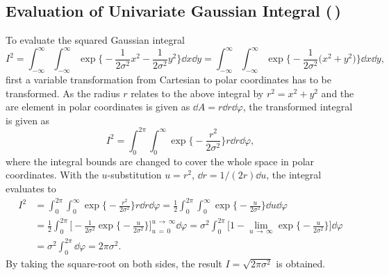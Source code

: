 \documentclass[11pt, a4paper]{scrartcl}
\newcommand{\diffstar}{\texorpdfstring{\raisebox{-1pt}{\resizebox{!}{8pt}{\(\star\)}}}{*}}
\newcommand{\twostar}  {(\diffstar\,\diffstar)}
\begin{document}
		\subsection{Evaluation of Univariate Gaussian Integral  \twostar}
			To evaluate the squared Gaussian integral
			\begin{equation}
				I^2
					= \int_{-\infty}^{\infty} \int_{-\infty}^{\infty} \! \exp\bigg\{\! -\frac{1}{2 \sigma^2} x^2 - \frac{1}{2 \sigma^2} y^2 \bigg\} \dd{x} \dd{y}
					= \int_{-\infty}^{\infty} \int_{-\infty}^{\infty} \! \exp\bigg\{\! -\frac{1}{2 \sigma^2} \big( x^2 + y^2 \big) \bigg\} \dd{x} \dd{y},
			\end{equation}
			first a variable transformation from Cartesian to polar coordinates has to be transformed. As the radius \(r\) relates to the above integral by \( r^2 = x^2 + y^2 \) and the are element in polar coordinates is given as \( \dd A = r \dd{r} \dd{\varphi} \), the transformed integral is given as
			\begin{equation}
				I^2 = \int_{0}^{2\pi} \int_{0}^{\infty}\! \exp\bigg\{\! -\frac{r^2}{2 \sigma^2} \bigg\} r \dd{r} \dd{\varphi},
			\end{equation}
			where the integral bounds are changed to cover the whole space in polar coordinates. With the \(u\)-substitution \( u = r^2 \), \( \dd r = 1/(2 r) \dd{u} \), the integral evaluates to
			\begin{align}
				I^2
					&= \int_{0}^{2\pi} \int_{0}^{\infty}\! \exp\bigg\{\! -\frac{r^2}{2 \sigma^2} \bigg\} r \dd{r} \dd{\varphi}
					 = \frac{1}{2} \int_{0}^{2\pi} \int_{0}^{\infty}\! \exp\bigg\{\! -\frac{u}{2 \sigma^2} \bigg\} \dd{u} \dd{\varphi} \\
					&= \frac{1}{2} \int_{0}^{2\pi} \Bigg[ -\frac{1}{2 \sigma^2} \exp\bigg\{\! -\frac{u}{2 \sigma^2} \bigg\} \Bigg]_{u \,=\, 0}^{u \,\to\, \infty} \dd{\varphi}
					 = \sigma^2 \int_{0}^{2\pi} \Bigg[ 1 - \lim\limits_{u \,\to\, \infty} \exp\bigg\{\! -\frac{u}{2 \sigma^2} \bigg\} \Bigg] \dd{\varphi} \\
					&= \sigma^2 \int_{0}^{2\pi} \dd{\varphi}
					 = 2 \pi \sigma^2.
			\end{align}
			By taking the square-root on both sides, the result \( I = \sqrt{2 \pi \sigma^2} \) is obtained.
\end{document}
